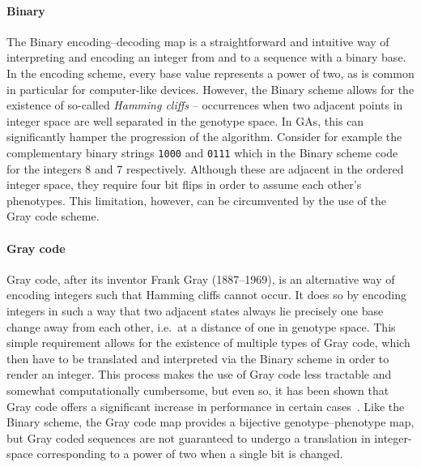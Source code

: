 \documentclass[a4paper,12pt]{article}
\theoremstyle{plain}
\theoremstyle{definition}
\begin{document}
         \paragraph{Binary}
            The Binary encoding--decoding map is a straightforward and intuitive 
            way of interpreting and encoding an integer from and to a sequence 
            with a binary base. In the encoding scheme, every base value represents a 
            power of two, as is common in particular for computer-like devices. However, the Binary scheme allows for the
            existence of so-called \textit{Hamming cliffs} -- occurrences when
            two adjacent points in integer space are well separated in the
            genotype space. 
            In GAs, this can significantly hamper the
            progression of the algorithm. Consider for example the complementary
            binary strings \texttt{1000} and \texttt{0111} which in the Binary scheme
            code for the integers 8 and 7 respectively. Although these are
            adjacent in the ordered integer space, they require four bit flips in
            order to assume each other's phenotypes. This
            limitation, however, can be circumvented by the use of the Gray 
            code scheme.

         \paragraph{Gray code}
            Gray code, after its inventor Frank Gray (1887--1969), is an
            alternative way of encoding integers such that Hamming cliffs cannot
            occur. It does so by encoding integers in such a way that two adjacent
            states always lie precisely one base change away from each other,
            i.e.\ at a distance of one in genotype space.
            This simple requirement allows for the existence of multiple
            types of Gray code, which then have to be translated and interpreted
            via the Binary scheme in order to render an integer. This process makes 
            the use of Gray code less tractable and somewhat computationally
            cumbersome, but even so, 
            it has been shown that Gray code offers a significant increase in performance 
            in certain cases~\cite{transforming_the_ss_with_gray}. Like the
            Binary scheme, the Gray code map provides a bijective
            genotype--phenotype map, but Gray coded sequences are not guaranteed
            to undergo a translation in integer-space corresponding to a power of two when a
            single bit is changed.  
            
\end{document}
